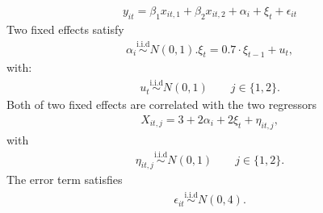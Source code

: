 \documentclass[a4paper,11pt,english]{sphinxmanual}
\begin{document}
\begin{fulllineitems}
\begin{description}
\end{description}
\begin{equation*}
\begin{split}y_{it} = \beta_{1}x_{it,1}+\beta_{2}x_{it,2}+\alpha_{i}+\xi_{t}+\epsilon_{it}\end{split}
\end{equation*}
\sphinxAtStartPar
Two fixed effects satisfy
\begin{equation*}
\begin{split}\alpha_{i} \stackrel{\text{i.i.d}}{\sim}N(0,1).
\xi_{t}=0.7 \cdot \xi_{t-1}+ u_{t},\end{split}
\end{equation*}
\sphinxAtStartPar
with:
\begin{equation*}
\begin{split}u_{t}\stackrel{\text{i.i.d}}{\sim} N(0,1) \qquad j\in \{1,2\}.\end{split}
\end{equation*}
\sphinxAtStartPar
Both of two fixed effects are correlated with the two regressors
\begin{equation*}
\begin{split}X_{it,j}=3+2\alpha_i+2\xi_t+\eta_{it,j},\end{split}
\end{equation*}
\sphinxAtStartPar
with
\begin{equation*}
\begin{split}\eta_{it,j}\stackrel{\text{i.i.d}}{\sim} N(0,1) \qquad j\in \{1,2\}.\end{split}
\end{equation*}
\sphinxAtStartPar
The error term satisfies
\begin{equation*}
\begin{split}\epsilon_{it} \stackrel{\text{i.i.d}}{\sim}N(0,4).\end{split}
\end{equation*}
\end{fulllineitems}

\end{document}
